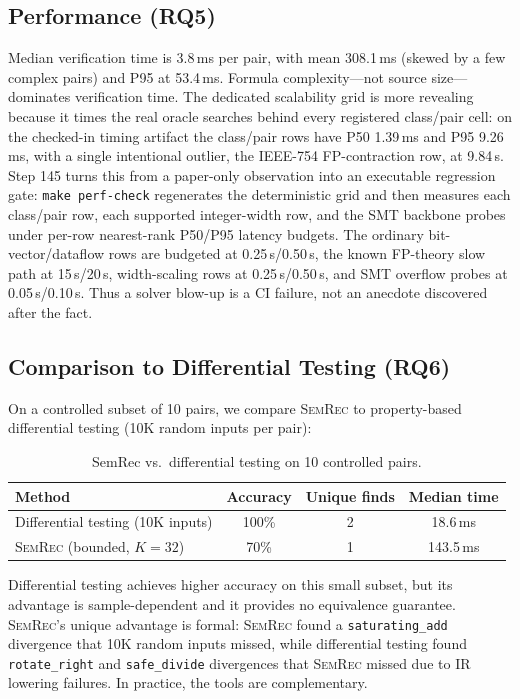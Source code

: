 \documentclass[10pt,a4paper]{article}
\begin{document}
\subsection{Performance (RQ5)}\label{sec:eval-perf}

Median verification time is 3.8\,ms per pair, with mean 308.1\,ms
(skewed by a few complex pairs) and P95 at 53.4\,ms.
Formula complexity---not
source size---dominates verification time.
The dedicated scalability grid is more revealing because it times the real
oracle searches behind every registered class/pair cell: on the checked-in
timing artifact the class/pair rows have P50 1.39\,ms and P95 9.26\,ms, with a
single intentional outlier, the IEEE-754 FP-contraction row, at 9.84\,s.  Step
145 turns this from a paper-only observation into an executable regression gate:
\texttt{make perf-check} regenerates the deterministic grid and then measures
each class/pair row, each supported integer-width row, and the SMT backbone
probes under per-row nearest-rank P50/P95 latency budgets.  The ordinary
bit-vector/dataflow rows are budgeted at 0.25\,s/0.50\,s, the known FP-theory
slow path at 15\,s/20\,s, width-scaling rows at 0.25\,s/0.50\,s, and SMT
overflow probes at 0.05\,s/0.10\,s.  Thus a solver blow-up is a CI failure, not
an anecdote discovered after the fact.

\subsection{Comparison to Differential Testing (RQ6)}\label{sec:eval-baseline}

On a controlled subset of 10 pairs, we compare \textsc{SemRec} to
property-based differential testing (10K random inputs per pair):

\begin{table}[t]
\centering
\small
\caption{SemRec vs.\ differential testing on 10 controlled pairs.}
\label{tab:baseline}
\begin{tabular}{@{}lccc@{}}
\toprule
Method & Accuracy & Unique finds & Median time \\
\midrule
Differential testing (10K inputs) & 100\% & 2 & 18.6\,ms \\
\textsc{SemRec} (bounded, $K{=}32$) & 70\% & 1 & 143.5\,ms \\
\bottomrule
\end{tabular}
\end{table}

Differential testing achieves higher accuracy on this small subset,
but its advantage is sample-dependent and it provides no equivalence
guarantee.  \textsc{SemRec}'s unique advantage is formal:
\textsc{SemRec} found a \texttt{saturating\_add} divergence that
10K random inputs missed, while differential testing found
\texttt{rotate\_right} and \texttt{safe\_divide} divergences that
\textsc{SemRec} missed due to IR lowering failures.  In practice,
the tools are complementary.
\end{document}

